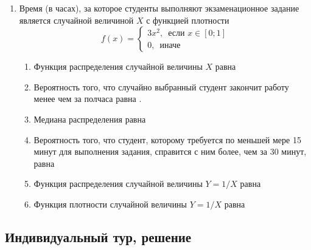 \documentclass[12pt, a4paper]{article}\usepackage[]{graphicx}\usepackage[]{color}
\begin{document}
\begin{enumerate}
					\item Время (в часах), за которое студенты выполняют экзаменационное задание является случайной величиной $X$ с функцией плотности
					\[
					f(x)=\begin{cases}
					3x^2, \, \text{ если } x \in [0;1] \\
					0, \, \text{ иначе }
					\end{cases}
					\]

					\begin{enumerate}
						\item Функция распределения случайной величины $X$ равна \underline{\hspace{2cm}}
						\item Вероятность того, что случайно выбранный студент закончит работу менее чем за полчаса равна \underline{\hspace{2cm}}.
						\item Медиана распределения равна \underline{\hspace{2cm}}
						\item Вероятность того, что студент, которому требуется по меньшей мере 15 минут для выполнения задания, справится с ним более, чем за 30 минут, равна \underline{\hspace{2cm}}
						\item Функция распределения случайной величины $Y=1/X$ равна \underline{\hspace{2cm}}
						\item Функция плотности случайной величины $Y=1/X$ равна \underline{\hspace{2cm}}
					\end{enumerate}

				\end{enumerate}

				\subsection{Индивидуальный тур, решение}
\end{document}
